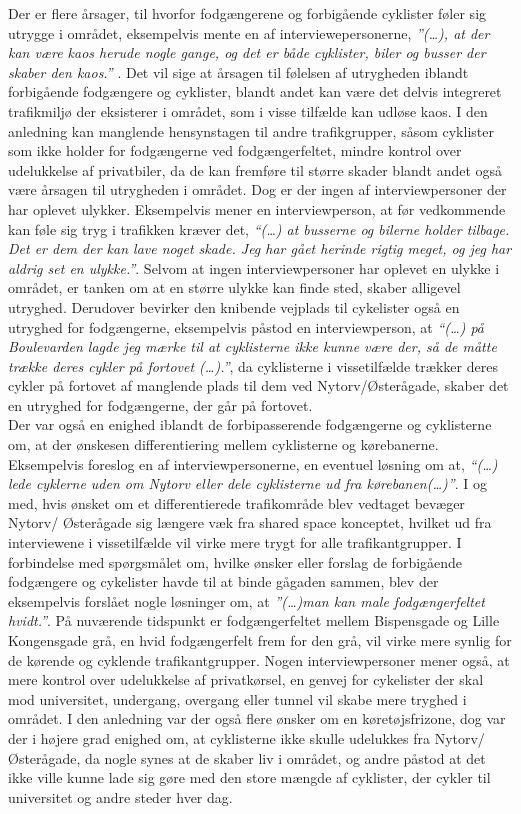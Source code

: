 Der er flere årsager, til hvorfor fodgængerene og forbigående cyklister føler sig utrygge i området, eksempelvis mente en af interviewepersonerne, \emph{”(…), at der kan være kaos herude nogle gange, og det er både cyklister, biler og busser der skaber den kaos.”} .  Det vil sige at årsagen til følelsen af utrygheden iblandt forbigående fodgængere og cyklister, blandt andet kan være det delvis integreret trafikmiljø der eksisterer i området, som i visse tilfælde kan udløse kaos. I den anledning kan manglende hensynstagen til andre trafikgrupper, såsom cyklister som ikke holder for fodgængerne ved fodgængerfeltet, mindre kontrol over udelukkelse af privatbiler, da de kan fremføre til større skader blandt andet også være årsagen til utrygheden i området. Dog er der ingen af interviewpersoner der har oplevet ulykker. Eksempelvis mener en interviewperson, at før vedkommende kan føle sig tryg i trafikken kræver det, \emph{“(…) at busserne og bilerne holder tilbage. Det er dem der kan lave noget skade. Jeg har gået herinde rigtig meget, og jeg har aldrig set en ulykke.”}. Selvom at ingen interviewpersoner har oplevet en ulykke i området, er tanken om at en større ulykke kan finde sted, skaber alligevel utryghed. Derudover bevirker den knibende vejplads til cykelister også en utryghed for fodgængerne, eksempelvis påstod en interviewperson, at \emph{“(…) på Boulevarden lagde jeg mærke til at cyklisterne ikke kunne være der, så de måtte trække deres cykler på fortovet (…).”}, da cyklisterne i vissetilfælde trækker deres cykler på fortovet af manglende plads til dem ved Nytorv/Østerågade, skaber det en utryghed for fodgængerne, der går på fortovet.
\\
Der var også en enighed iblandt de forbipasserende fodgængerne og cyklisterne om, at der ønskesen differentiering mellem cyklisterne og kørebanerne. Eksempelvis foreslog en af interviewpersonerne, en eventuel løsning om at, \emph{“(…) lede cyklerne uden om Nytorv eller dele cyklisterne ud fra kørebanen(…)”}. I og med, hvis ønsket om et differentierede trafikområde blev vedtaget bevæger Nytorv/ Østerågade sig længere væk fra shared space konceptet, hvilket ud fra interviewene i vissetilfælde vil virke mere trygt for alle trafikantgrupper. I forbindelse med spørgsmålet om, hvilke ønsker eller forslag de forbigående fodgængere og cykelister havde til at binde gågaden sammen, blev der eksempelvis forslået nogle løsninger om, at \emph{”(…)man kan male fodgængerfeltet hvidt.”}. På nuværende tidspunkt er fodgængerfeltet mellem Bispensgade og Lille Kongensgade grå, en hvid fodgængerfelt frem for den grå, vil virke mere synlig for de kørende og cyklende trafikantgrupper. Nogen interviewpersoner mener også, at mere kontrol over udelukkelse af privatkørsel, en genvej for cykelister der skal mod universitet, undergang, overgang eller tunnel vil skabe mere tryghed i området. I den anledning var der også flere ønsker om en køretøjsfrizone, dog var der i højere grad enighed om, at cyklisterne ikke skulle udelukkes fra Nytorv/Østerågade, da nogle synes at de skaber liv i området, og andre påstod at det ikke ville kunne lade sig gøre med den store mængde af cyklister, der cykler til universitet og andre steder hver dag.
